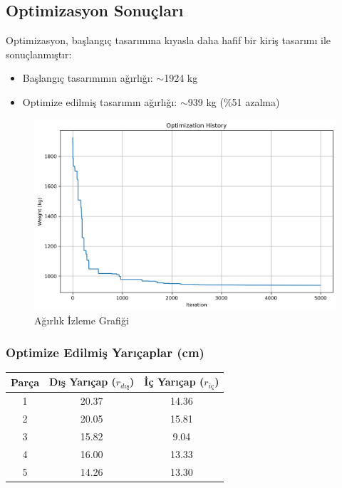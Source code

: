 \subsection{Optimizasyon Sonuçları}
Optimizasyon, başlangıç tasarımına kıyasla daha hafif bir kiriş tasarımı ile sonuçlanmıştır:

\begin{itemize}
    \item Başlangıç tasarımının ağırlığı: $\sim$1924 kg
    \item Optimize edilmiş tasarımın ağırlığı: $\sim$939 kg (\%51 azalma)
\end{itemize}

\begin{figure}[H]
    \centering
    \includegraphics[width=1\textwidth]{weeks_new/imgs/optimization_history.png}
    \caption{Ağırlık İzleme Grafiği}
    \label{fig:optimization_history}
\end{figure}

\subsubsection{Optimize Edilmiş Yarıçaplar (cm)}
\begin{center}
\begin{tabular}{|c|c|c|}
\hline
Parça & Dış Yarıçap ($r_{dış}$) & İç Yarıçap ($r_{iç}$) \\
\hline
1 & 20.37 & 14.36 \\
2 & 20.05 & 15.81 \\
3 & 15.82 & 9.04 \\
4 & 16.00 & 13.33 \\
5 & 14.26 & 13.30 \\
\hline
\end{tabular}
\end{center}

